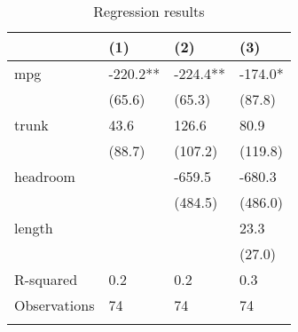 \documentclass{article}
\begin{document}
\begin{table}[tbp] \centering%
\caption{Regression results}%
\begin{tabularx}{\textwidth}{lCCC}
\toprule
&(1)&(2)&(3) \tabularnewline
\midrule\addlinespace[1.5ex]
mpg&-220.2**&-224.4**&-174.0* \tabularnewline
&(65.6)&(65.3)&(87.8) \tabularnewline
trunk&43.6&126.6&80.9 \tabularnewline
&(88.7)&(107.2)&(119.8) \tabularnewline
headroom&&-659.5&-680.3 \tabularnewline
&&(484.5)&(486.0) \tabularnewline
length&&&23.3 \tabularnewline
&&&(27.0) \tabularnewline
\midrule R-squared&0.2&0.2&0.3 \tabularnewline
Observations&74&74&74 \tabularnewline
\bottomrule \addlinespace[1.5ex]
\end{tabularx}%
\end{table}%
\end{document}
